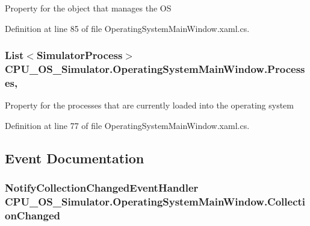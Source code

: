 Property for the object that manages the O\+S 



Definition at line 85 of file Operating\+System\+Main\+Window.\+xaml.\+cs.

\hypertarget{class_c_p_u___o_s___simulator_1_1_operating_system_main_window_aadbbb1f580d767211e180a95ec71b849}{}
\subsubsection[{Processes}]{\setlength{\rightskip}{0pt plus 5cm}List$<${\bf Simulator\+Process}$>$ C\+P\+U\+\_\+\+O\+S\+\_\+\+Simulator.\+Operating\+System\+Main\+Window.\+Processes\hspace{0.3cm}{\ttfamily [get]}, {\ttfamily [set]}}\label{class_c_p_u___o_s___simulator_1_1_operating_system_main_window_aadbbb1f580d767211e180a95ec71b849}


Property for the processes that are currently loaded into the operating system 



Definition at line 77 of file Operating\+System\+Main\+Window.\+xaml.\+cs.



\subsection{Event Documentation}
\hypertarget{class_c_p_u___o_s___simulator_1_1_operating_system_main_window_af8aeaf0c83021caf8f735ea7c051848c}{}
\subsubsection[{Collection\+Changed}]{\setlength{\rightskip}{0pt plus 5cm}Notify\+Collection\+Changed\+Event\+Handler C\+P\+U\+\_\+\+O\+S\+\_\+\+Simulator.\+Operating\+System\+Main\+Window.\+Collection\+Changed}\label{class_c_p_u___o_s___simulator_1_1_operating_system_main_window_af8aeaf0c83021caf8f735ea7c051848c}



